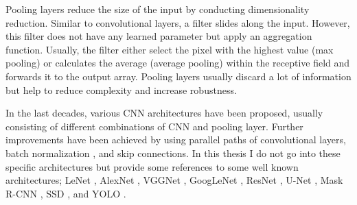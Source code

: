 Pooling layers reduce the size of the input by conducting dimensionality reduction.
Similar to convolutional layers, a filter slides along the input.
However, this filter does not have any learned parameter but apply an aggregation function.
Usually, the filter either select the pixel with the highest value (max pooling) or calculates the average (average pooling) within the receptive field and forwards it to the output array.
Pooling layers usually discard a lot of information but help to reduce complexity and increase robustness.

In the last decades, various CNN architectures have been proposed, usually consisting of different combinations of CNN and pooling layer.
Further improvements have been achieved by using parallel paths of convolutional layers, batch normalization , and skip connections.
In this thesis I do not go into these specific architectures but provide some references to some well known architectures; LeNet , AlexNet , VGGNet , GoogLeNet , ResNet , U-Net , Mask R-CNN , SSD , and YOLO .

